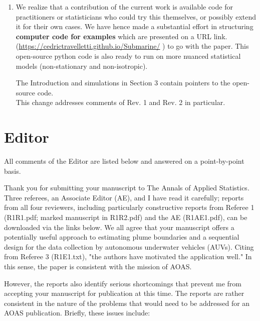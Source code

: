 \documentclass[a4paper]{article}
\newcounter{reviewer}
\begin{document}
\begin{enumerate}
\item We realize that a contribution of the current work is available code for practitioners or statisticians who could try this themselves, or possibly extend it for their own cases. We have hence made a substantial effort in structuring {\bf{computer code for examples}} which are presented on a URL link. (\url{https://cedrictravelletti.github.io/Submarine/} )
 to go with the paper. This open-source python code is also ready to run on more nuanced statistical models (non-stationary and non-isotropic). 
 
The Introduction and simulations in Section 3 contain pointers to the open-source code. \\
This change addresses comments of Rev. 1 and Rev. 2 in particular.

\end{enumerate}
\par \vspace{1em}


\section*{Editor}
All comments of the Editor are listed below and answered on a point-by-point basis.

	
\vspace{5mm}

Thank you for submitting your manuscript to The Annals of 
Applied Statistics.  Three referees, an Associate Editor (AE),
and I have read it carefully; reports from all four reviewers,
including particularly constructive reports from Referee 1
(R1R1.pdf; marked manuscript in R1R2.pdf) and the AE (R1AE1.pdf), 
can be downloaded via the links below. We all agree that your 
manuscript offers a potentially useful approach to estimating 
plume boundaries and a sequential design for the data collection
by autonomous underwater vehicles (AUVs). Citing from Referee 3
(R1E1.txt), "the authors have motivated the application well."
In this sense, the paper is consistent with the mission of AOAS.

However, the reports also identify serious shortcomings that 
prevent me from accepting your manuscript for publication at
this time. The reports are rather consistent in the nature of 
the problems that would need to be addressed for an AOAS publication.  
Briefly, these issues include:
\end{document}
